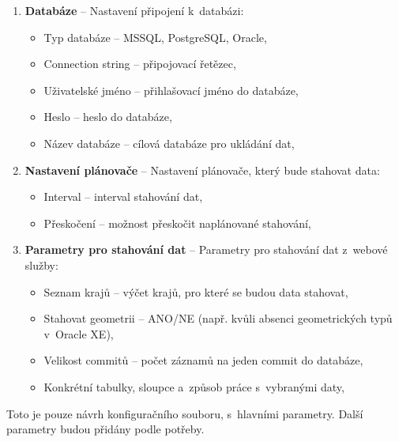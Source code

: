 \begin{enumerate}
    \item \textbf{Databáze} -- Nastavení připojení k~databázi:
    \begin{itemize}
        \item Typ databáze -- MSSQL, PostgreSQL, Oracle,
        \item Connection string -- připojovací řetězec,
        \item Uživatelské jméno -- přihlašovací jméno do databáze,
        \item Heslo -- heslo do databáze,
        \item Název databáze -- cílová databáze pro ukládání dat,
    \end{itemize}

    \newpage

    \item \textbf{Nastavení plánovače} -- Nastavení plánovače, který bude stahovat data:
    \begin{itemize}
        \item Interval -- interval stahování dat,
        \item Přeskočení -- možnost přeskočit naplánované stahování,
    \end{itemize}
    
    \item \textbf{Parametry pro stahování dat} -- Parametry pro stahování dat z~webové služby:
    \begin{itemize}
        \item Seznam krajů -- výčet krajů, pro které se budou data stahovat,
        \item Stahovat geometrii -- ANO/NE (např. kvůli absenci geometrických typů v~Oracle XE),
        \item Velikost commitů -- počet záznamů na jeden commit do databáze,
        \item Konkrétní tabulky, sloupce a~způsob práce s~vybranými daty,
    \end{itemize}
\end{enumerate}

Toto je pouze návrh konfiguračního souboru, s~hlavními parametry. 
Další parametry budou přidány podle potřeby.